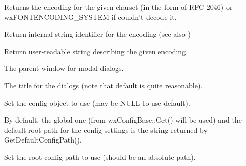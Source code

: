 \label{wxfontmappercharsettoencoding}


Returns the encoding for the given charset (in the form of RFC 2046) or
wxFONTENCODING\_SYSTEM if couldn't decode it.

\label{wxfontmappergetencodingname}


Return internal string identifier for the encoding (see also 
)

\label{wxfontmappergetencodingdescription}


Return user-readable string describing the given encoding.

\label{wxfontmappersetdialogparent}


The parent window for modal dialogs.

\label{wxfontmappersetdialogtitle}


The title for the dialogs (note that default is quite reasonable).

\label{wxfontmappersetconfig}


Set the config object to use (may be NULL to use default).

By default, the global one (from wxConfigBase::Get() will be used) 
and the default root path for the config settings is the string returned by
GetDefaultConfigPath().

\label{wxfontmappersetconfigpath}


Set the root config path to use (should be an absolute path).


